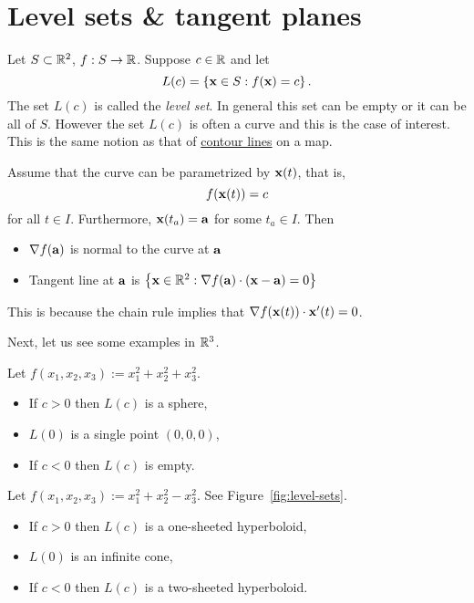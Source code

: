 \section{Level sets \& tangent planes}

Let \(S\subset \bR^2\), \(f:S\to\bR\).
Suppose \(c\in \bR\) and let
\[
    L(c) = \left\{\xx\in S : f(\xx)=c\right\}.
\]
The set \(L(c)\) is called the \emph{level set}.
In general this set can be empty or it can be all of \(S\).
However the set \(L(c)\) is often a curve and this is the case of interest.
This is the same notion as that of \href{https://en.wikipedia.org/wiki/Contour_line}{contour lines} on a map.

Assume that the curve can be parametrized by \(\xx(t)\), that is,
\[f(\xx(t))=c\] for all \(t\in I\). Furthermore, $\xx(t_a) = \aa$ for some \(t_a \in I\).
Then
\begin{itemize}
    \item \(\nabla f(\aa)\) is normal to the curve at \(\aa\)
    \item Tangent line at \(\aa\) is
          \(\left\{\xx\in\bR^2: \nabla f(\aa) \cdot (\xx-\aa)=0\right\}\)
\end{itemize}

This is because the chain rule implies that \(\nabla f(\xx(t)) \cdot \xx'(t) = 0\).


Next, let us see some examples in $\bR^3$.
\begin{example*}
    Let \(f(x_1,x_2,x_3):=x_1^2 + x_2^2 + x_3^2\).
    \begin{itemize}
        \item If \(c>0\) then \(L(c)\) %
              is a sphere,
        \item \(L(0) \) is a single point \((0,0,0)\),
        \item If \(c<0\) then \(L(c)\) is empty.
    \end{itemize}
\end{example*}

\begin{example*}
    Let \(f(x_1,x_2,x_3):=x_1^2 + x_2^2 - x_3^2\).
    See Figure~\ref{fig:level-sets}.
    \begin{itemize}
        \item If \(c>0\) then \(L(c)\) is a one-sheeted hyperboloid,
        \item \(L(0) \) is an infinite cone,
        \item If \(c<0\) then \(L(c)\) is a two-sheeted hyperboloid.
    \end{itemize}
\end{example*}

